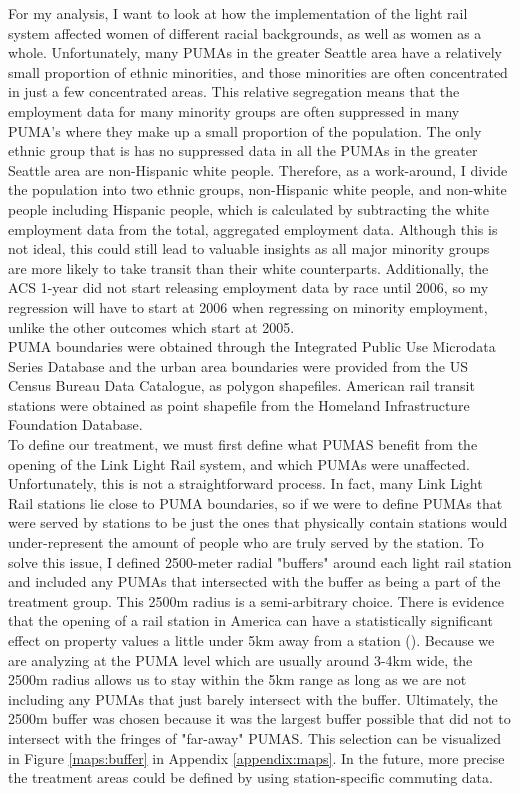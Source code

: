 \documentclass{article}
\begin{document}
For my analysis, I want to look at how the implementation of the light rail system affected women of different racial backgrounds, as well as women as a whole. Unfortunately, many PUMAs in the greater Seattle area have a relatively small proportion of ethnic minorities, and those minorities are often concentrated in just a few concentrated areas. This relative segregation means that the employment data for many minority groups are often suppressed in many PUMA's where they make up a small proportion of the population. The only ethnic group that is has no suppressed data in all the PUMAs in the greater Seattle area are non-Hispanic white people. Therefore, as a work-around, I divide the population into two ethnic groups, non-Hispanic white people, and non-white people including Hispanic people, which is calculated by subtracting the white employment data from the total, aggregated employment data. Although this is not ideal, this could still lead to valuable insights as all major minority groups are more likely to take transit than their white counterparts. Additionally, the ACS 1-year did not start releasing employment data by race until 2006, so my regression will have to start at 2006 when regressing on minority employment, unlike the other outcomes which start at 2005.\\

PUMA boundaries were obtained through the Integrated Public Use Microdata Series Database and the urban area boundaries were provided from the US Census Bureau Data Catalogue, as polygon shapefiles. American rail transit stations were obtained as point shapefile from the Homeland Infrastructure Foundation Database. \\

To define our treatment, we must first define what PUMAS benefit from the opening of the Link Light Rail system, and which PUMAs were unaffected. Unfortunately, this is not a straightforward process. In fact, many Link Light Rail stations lie close to PUMA boundaries, so if we were to define PUMAs that were served by stations to be just the ones that physically contain stations would under-represent the amount of people who are truly served by the station. To solve this issue, I defined 2500-meter radial "buffers" around each light rail station and included any PUMAs that intersected with the buffer as being a part of the treatment group. This 2500m radius is a semi-arbitrary choice. There is evidence that the opening of a rail station in America can have a statistically significant effect on property values a little under 5km away from a station (\cite{debrezion_impact_2007}). Because we are analyzing at the PUMA level which are usually around 3-4km wide, the 2500m radius allows us to stay within the 5km range as long as we are not including any PUMAs that just barely intersect with the buffer. Ultimately, the 2500m buffer was chosen because it was the largest buffer possible that did not to intersect with the fringes of "far-away" PUMAS. This selection can be visualized in Figure \ref{maps:buffer} in Appendix \ref{appendix:maps}. In the future, more precise the treatment areas could be defined by using station-specific commuting data. \\
\end{document}
